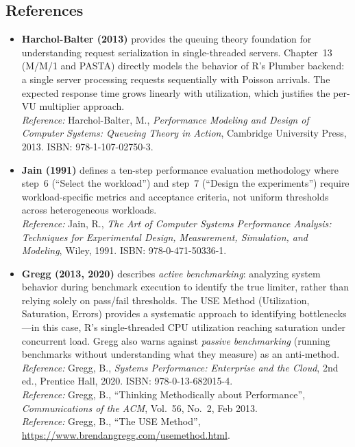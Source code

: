 \documentclass[11pt,a4paper]{article}
\begin{document}
\subsection{References}

\begin{itemize}
  \item \textbf{Harchol-Balter (2013)} provides the queuing theory
        foundation for understanding request serialization in
        single-threaded servers. Chapter~13 (M/M/1 and PASTA) directly
        models the behavior of R's Plumber backend: a single server
        processing requests sequentially with Poisson arrivals. The
        expected response time grows linearly with utilization, which
        justifies the per-VU multiplier approach.\\
        \emph{Reference:} Harchol-Balter, M., \emph{Performance
        Modeling and Design of Computer Systems: Queueing Theory in
        Action}, Cambridge University Press, 2013.
        ISBN: 978-1-107-02750-3.

  \item \textbf{Jain (1991)} defines a ten-step performance evaluation
        methodology where step~6 (``Select the workload'') and step~7
        (``Design the experiments'') require workload-specific metrics
        and acceptance criteria, not uniform thresholds across
        heterogeneous workloads.\\
        \emph{Reference:} Jain, R., \emph{The Art of Computer Systems
        Performance Analysis: Techniques for Experimental Design,
        Measurement, Simulation, and Modeling}, Wiley, 1991.
        ISBN: 978-0-471-50336-1.

  \item \textbf{Gregg (2013, 2020)} describes \emph{active benchmarking}:
        analyzing system behavior during benchmark execution to identify
        the true limiter, rather than relying solely on pass/fail
        thresholds. The USE Method (Utilization, Saturation, Errors)
        provides a systematic approach to identifying bottlenecks---in
        this case, R's single-threaded CPU utilization reaching
        saturation under concurrent load. Gregg also warns against
        \emph{passive benchmarking} (running benchmarks without
        understanding what they measure) as an anti-method.\\
        \emph{Reference:} Gregg, B., \emph{Systems Performance:
        Enterprise and the Cloud}, 2nd ed., Prentice Hall, 2020.
        ISBN: 978-0-13-682015-4.\\
        \emph{Reference:} Gregg, B., ``Thinking Methodically about
        Performance'', \emph{Communications of the ACM}, Vol.~56,
        No.~2, Feb 2013.\\
        \emph{Reference:} Gregg, B., ``The USE Method'',
        \url{https://www.brendangregg.com/usemethod.html}.


\end{itemize}
\end{document}
